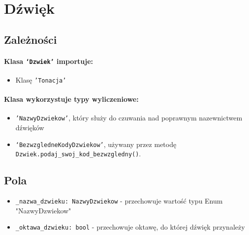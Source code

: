 \documentclass[dokumentacja.tex]{subfiles}
\begin{document}
\section{Dźwięk}

\subsection{Zależności}
\paragraph*{Klasa \texttt{`Dzwiek'} importuje:}
\begin{itemize}
    \item Klasę \texttt{'Tonacja'}
\end{itemize}
\paragraph*{Klasa wykorzystuje typy wyliczeniowe:}
\begin{itemize}
    \item \texttt{'NazwyDzwiekow'}, który służy do czuwania nad poprawnym nazewnictwem dźwięków
    \item \texttt{`BezwzgledneKodyDzwiekow'}, używany przez metodę \texttt{Dzwiek.podaj\_swoj\_kod\_bezwzgledny()}.
\end{itemize}

\subsection{Pola}
\begin{itemize}
    \item \texttt{\_nazwa\_dzwieku: NazwyDzwiekow} - przechowuje wartość typu Enum "NazwyDzwiekow"
    \item \texttt{\_oktawa\_dzwieku: bool} - przechowuje oktawę, do której dźwięk przynależy
\end{itemize}
\end{document}
